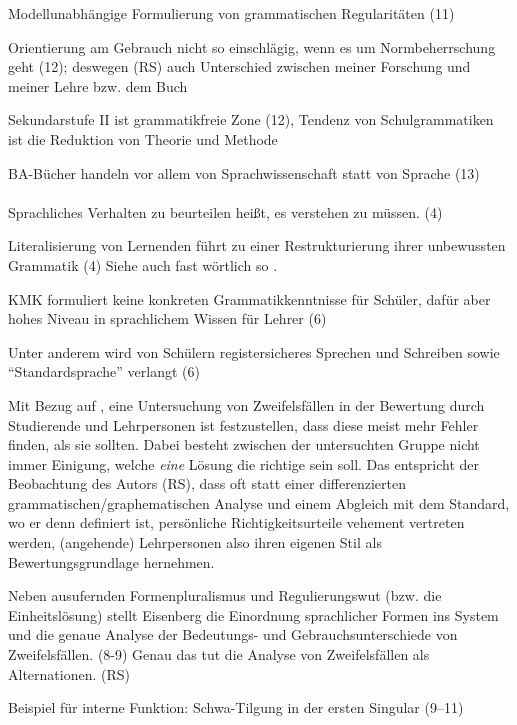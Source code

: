 Modellunabhängige Formulierung von grammatischen Regularitäten (11)

Orientierung am Gebrauch nicht so einschlägig, wenn es um Normbeherrschung geht (12); deswegen (RS) auch Unterschied zwischen meiner Forschung und meiner Lehre bzw. dem Buch

Sekundarstufe II ist grammatikfreie Zone (12), Tendenz von Schulgrammatiken ist die Reduktion von Theorie und Methode

BA-Bücher handeln vor allem von Sprachwissenschaft statt von Sprache (13)

\paragraph*{\citet{Eisenberg2004}}

Sprachliches Verhalten zu beurteilen heißt, es verstehen zu müssen. (4)

Literalisierung von Lernenden führt zu einer Restrukturierung ihrer unbewussten Grammatik (4) Siehe auch fast wörtlich so \citet[78]{Portmanntselikas2011}.

KMK formuliert keine konkreten Grammatikkenntnisse für Schüler, dafür aber hohes Niveau in sprachlichem Wissen für Lehrer (6)

Unter anderem wird von Schülern registersicheres Sprechen und Schreiben sowie "`Standardsprache"' verlangt (6)

Mit Bezug auf \citet{Braun1979}, eine Untersuchung von Zweifelsfällen in der Bewertung durch Studierende und Lehrpersonen ist festzustellen, dass diese meist mehr Fehler finden, als sie sollten.
Dabei besteht zwischen der untersuchten Gruppe nicht immer Einigung, welche \textit{eine} Lösung die richtige sein soll.
Das entspricht der Beobachtung des Autors (RS), dass oft statt einer differenzierten grammatischen\slash graphematischen Analyse und einem Abgleich mit dem Standard, wo er denn definiert ist, persönliche Richtigkeitsurteile vehement vertreten werden, (angehende) Lehrpersonen also ihren eigenen Stil als Bewertungsgrundlage hernehmen.

Neben ausufernden Formenpluralismus und Regulierungswut (bzw. die Einheitslösung) stellt Eisenberg die Einordnung sprachlicher Formen ins System und die genaue Analyse der Bedeutungs- und Gebrauchsunterschiede von Zweifelsfällen. (8-9) Genau das tut die Analyse von Zweifelsfällen als Alternationen. (RS)

Beispiel für interne Funktion: Schwa-Tilgung in der ersten Singular (9--11)

